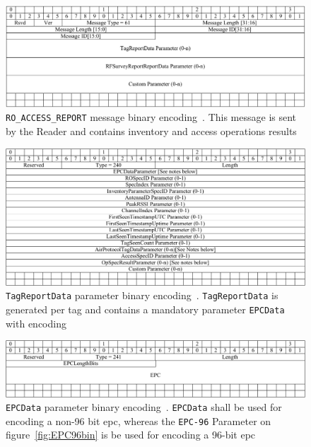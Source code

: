 \begin{figure}[]
    \centering
    \includegraphics[width=\textwidth]{./figs/02-state-of-the-art/RO_ACCESS_REPORT_bin.pdf}
    \caption[\texttt{RO\_ACCESS\_REPORT} message binary encoding]{\texttt{RO\_ACCESS\_REPORT} message binary encoding~\cite{LowLevelReader}. This message is sent by the Reader and contains inventory and access operations results} 
    \label{fig:ROACCESSREPORTbin}
\end{figure}

\begin{figure}[]
    \centering
    \includegraphics[width=\textwidth]{./figs/02-state-of-the-art/TagReportData_bin.pdf}
    \caption[\texttt{TagReportData} parameter binary encoding]{\texttt{TagReportData} parameter binary encoding~\cite{LowLevelReader}. \texttt{TagReportData} is generated per tag and contains a mandatory parameter \texttt{EPCData} with encoding} 
    \label{fig:TagReportDatabin}
\end{figure}

\begin{figure}[]
    \centering
    \includegraphics[width=\textwidth]{./figs/02-state-of-the-art/EPCDataParameter_bin.pdf}
    \caption[\texttt{EPCData} parameter binary encoding]{\texttt{EPCData} parameter binary encoding~\cite{LowLevelReader}. \texttt{EPCData} shall be used for encoding a non-96 bit \ac{epc}, whereas the \texttt{EPC-96} Parameter on figure~\ref{fig:EPC96bin} is be used for encoding a 96-bit \ac{epc}} 
    \label{fig:EPCDatabin}
\end{figure}

